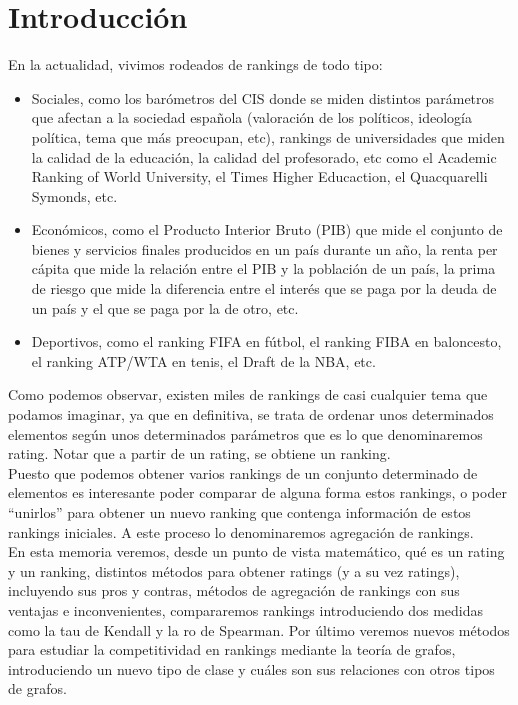 \chapter{Introducción}

En la actualidad, vivimos rodeados de rankings de todo tipo: 
\begin{itemize}
\item Sociales, como los barómetros del CIS donde se miden distintos parámetros que afectan a la sociedad española (valoración de los políticos, ideología política, tema que más preocupan, etc), rankings de universidades que miden la calidad de la educación, la calidad del profesorado, etc como el Academic Ranking of World University, el Times Higher Educaction, el Quacquarelli Symonds, etc.
\item Económicos, como el Producto Interior Bruto (PIB) que mide el conjunto de bienes y servicios finales producidos en un país durante un año, la renta per cápita que mide la relación entre el PIB y la población de un país, la prima de riesgo que mide la diferencia entre el interés que se paga por la deuda de un país y el que se paga por la de otro, etc.
\item Deportivos, como el ranking FIFA en fútbol, el ranking FIBA en baloncesto, el ranking ATP/WTA en tenis, el Draft de la NBA, etc.
\end{itemize}

Como podemos observar, existen miles de rankings de casi cualquier tema que podamos imaginar, ya que en definitiva, se trata de ordenar unos determinados elementos según unos determinados parámetros que es lo que denominaremos rating. Notar que a partir de un rating, se obtiene un ranking.\\

Puesto que podemos obtener varios rankings de un conjunto determinado de elementos es interesante poder comparar de alguna forma estos rankings, o poder ``unirlos'' para obtener un nuevo ranking que contenga información de estos rankings iniciales. A este proceso lo denominaremos agregación de rankings.\\

En esta memoria veremos, desde un punto de vista matemático, qué es un rating y un ranking, distintos métodos para obtener ratings (y a su vez ratings), incluyendo sus pros y contras, métodos de agregación de rankings con sus ventajas e inconvenientes, compararemos rankings introduciendo dos medidas como la tau de Kendall y la ro de Spearman. Por último veremos nuevos métodos para estudiar la competitividad en rankings mediante la teoría de grafos, introduciendo un nuevo tipo de clase y cuáles son sus relaciones con otros tipos de grafos.
